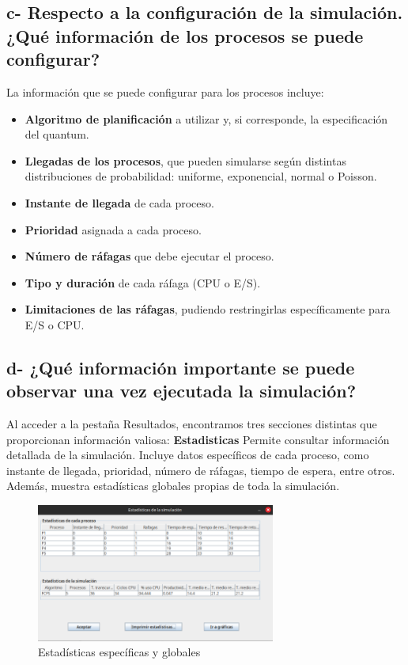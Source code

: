 \documentclass{article}
\begin{document}
\subsection*{c- Respecto a la configuración de la simulación. ¿Qué información de los procesos se puede configurar?}

\noindent
La información que se puede configurar para los procesos incluye:
\begin{itemize}
  \item \textbf{Algoritmo de planificación} a utilizar y, si corresponde, la especificación del quantum.
  \item \textbf{Llegadas de los procesos}, que pueden simularse según distintas distribuciones de probabilidad: 
  uniforme, exponencial, normal o Poisson.
  \item \textbf{Instante de llegada} de cada proceso.
  \item \textbf{Prioridad} asignada a cada proceso.
  \item \textbf{Número de ráfagas} que debe ejecutar el proceso.
  \item \textbf{Tipo y duración} de cada ráfaga (CPU o E/S).
  \item \textbf{Limitaciones de las ráfagas}, pudiendo restringirlas específicamente para E/S o CPU.\@
\end{itemize}

\subsection*{d- ¿Qué información importante se puede observar una vez ejecutada la simulación?}

\noindent
Al acceder a la pestaña Resultados, encontramos tres secciones distintas que proporcionan información valiosa:
\textbf{Estadisticas}
Permite consultar información detallada de la simulación. Incluye datos específicos de cada proceso, como instante de llegada,
prioridad, número de ráfagas, tiempo de espera, entre otros. Además, muestra estadísticas globales propias de toda la simulación.
\begin{figure}[h]
  \centering
  \includegraphics[width=0.7\textwidth]{resources/3dEst.png}
  \caption{Estadísticas específicas y globales}
\end{figure}
\end{document}
